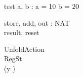 \documentclass{llncs}
\begin{document}
\begin{schema}{test}
a, b : \nat
\where
a = 10 \land b = 20
\end{schema}
\begin{circus}
\circchannel store, add, out : NAT\\
\circchannel result, reset\\
\end{circus}
\begin{circus}
\circprocess UnfoldAction \circdef\\
	\circbegin \circstate RegSt \\
\circspot (y \prefixcolon [(y' = x)])
	\circend\\
\end{circus}
\end{document}
